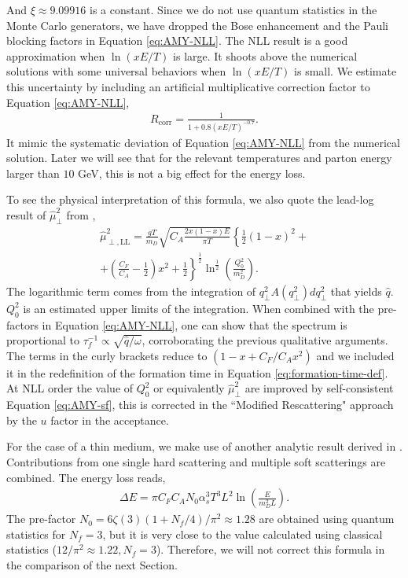 \documentclass[aps, prc, reprint, amsmath, groupedaddress, nofootinbib]{revtex4-1}
\begin{document}
And $\xi\approx9.09916$ is a constant. 
Since we do not use quantum statistics in the Monte Carlo generators, we have dropped the Bose enhancement and the Pauli blocking factors in Equation \ref{eq:AMY-NLL}.
The NLL result is a good approximation when $\ln(xE/T)$ is large. 
It shoots above the numerical solutions with some universal behaviors when $\ln(xE/T)$ is small.
We estimate this uncertainty by including an artificial multiplicative correction factor to Equation \ref{eq:AMY-NLL}, 
\begin{eqnarray}\label{eq:correction}
R_{\textrm{corr}} = \frac{1}{1+0.8\left(xE/T\right)^{-0.7}}.
\end{eqnarray}
It mimic the systematic deviation of Equation \ref{eq:AMY-NLL} from the numerical solution. 
Later we will see that for the relevant temperatures and parton energy larger than $10$ GeV, this is not a big effect for the energy loss.

To see the physical interpretation of this formula, we also quote the lead-log result of $\hat{\mu}_\perp^2$ from \cite{Arnold:2008zu},
\begin{eqnarray}\label{eq:AMY-LL}
\nonumber
\hat{\mu}_{\perp, \textrm{LL}}^2 = \frac{gT}{m_D} \sqrt{C_A\frac{2x(1-x)E}{\pi T}}\left\{
\frac{1}{2}(1-x)^2 + \right.\\
\left. + \left(\frac{C_F}{C_A} - \frac{1}{2}\right)x^2 + \frac{1}{2}\right\}^{\frac{1}{2}}\ln^{\frac{1}{2}}\left(\frac{Q_0^2}{m_D^2}\right).
\end{eqnarray}
The logarithmic term comes from the integration of $q_\perp^2 A(q_\perp^2)dq_\perp^2$ that yields $\hat{q}$.
$Q_0^2$ is an estimated upper limits of the integration.
When combined with the pre-factors in Equation \ref{eq:AMY-NLL}, one can show that the spectrum is proportional to $\tau_f^{-1} \propto \sqrt{\hat{q}/\omega}$, corroborating the previous qualitative arguments.
The terms in the curly brackets reduce to $(1-x+C_F/C_Ax^2)$ and we included it in the redefinition of the formation time in Equation \ref{eq:formation-time-def}.
At NLL order the value of $Q_0^2$ or equivalently $\hat{\mu}_\perp^2$ are improved by self-consistent Equation \ref{eq:AMY-sf}, this is corrected in the ``Modified Rescattering" approach by the $u$ factor in the acceptance.

For the case of a thin medium, we make use of another analytic result derived in \cite{Arnold:2009mr}. 
Contributions from one single hard scattering and multiple soft scatterings are combined.
The energy loss reads,
\begin{eqnarray}\label{eq:dE-thin}
\Delta E = \pi C_F C_A N_0 \alpha_s^3 T^3 L^2 \ln\left(\frac{E}{m_D^2 L}\right).
\end{eqnarray}
The pre-factor $N_0 = 6\zeta(3)(1+N_f/4)/\pi^2 \approx 1.28$ 
are obtained using quantum statistics for $N_f=3$, but it is very close to the value calculated using classical statistics ($12/\pi^2 \approx 1.22, N_f=3$).
Therefore, we will not correct this formula in the comparison of the next Section.
\end{document}
